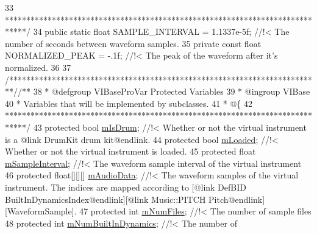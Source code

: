 \begin{DoxyCodeInclude}
33 \textcolor{comment}{    *****************************************************************************/}
34     \textcolor{keyword}{public} \textcolor{keyword}{static} \textcolor{keywordtype}{float} SAMPLE\_INTERVAL = 1.1337e-5f; \textcolor{comment}{//!< The number of seconds between waveform samples.}
35 \textcolor{comment}{}    \textcolor{keyword}{private} \textcolor{keyword}{const} \textcolor{keywordtype}{float} NORMALIZED\_PEAK = -.1f; \textcolor{comment}{//!< The peak of the waveform after it's normalized.}
36 \textcolor{comment}{}
37     \textcolor{comment}{/*************************************************************************/}\textcolor{comment}{/** }
38 \textcolor{comment}{     * @defgroup VIBaseProVar Protected Variables}
39 \textcolor{comment}{     * @ingroup VIBase}
40 \textcolor{comment}{     * Variables that will be implemented by subclasses.}
41 \textcolor{comment}{     * @\{}
42 \textcolor{comment}{    *****************************************************************************/}
43     \textcolor{keyword}{protected} \textcolor{keywordtype}{bool}                               \hyperlink{group___v_i_base_pro_var_ga47dbd8aa02ab32b8f802adfd2d3d81de}{mIsDrum}; \textcolor{comment}{//!< Whether or not the virtual instrument
       is a @link DrumKit drum kit@endlink. }
44 \textcolor{comment}{}    \textcolor{keyword}{protected} \textcolor{keywordtype}{bool}                               \hyperlink{group___v_i_base_pro_var_ga8978807d1878db5aae91fbd057c46097}{mLoaded}; \textcolor{comment}{//!< Whether or not the virtual instrument
       is loaded.}
45 \textcolor{comment}{}    \textcolor{keyword}{protected} \textcolor{keywordtype}{float}                              \hyperlink{group___v_i_base_pro_var_ga20c1d3d25ea666378d72c833d160ae2e}{mSampleInterval}; \textcolor{comment}{//!< The waveform sample
       interval of the virtual instrument}
46 \textcolor{comment}{}    \textcolor{keyword}{protected} \textcolor{keywordtype}{float}[][][]                        \hyperlink{group___v_i_base_pro_var_ga52e76d9b74408660584676035a92a2c6}{mAudioData}; \textcolor{comment}{//!< The waveform samples of the
       virtual instrument. The indices are mapped according to [@link DefBID BuiltInDynamicsIndex@endlink][@link
       Music::PITCH Pitch@endlink][WaveformSample].}
47 \textcolor{comment}{}    \textcolor{keyword}{protected} \textcolor{keywordtype}{int}                                \hyperlink{group___v_i_base_pro_var_ga9a602db8c9833ce75d95dd453c27d341}{mNumFiles}; \textcolor{comment}{//!< The number of sample files}
48 \textcolor{comment}{}    \textcolor{keyword}{protected} \textcolor{keywordtype}{int}                                \hyperlink{group___v_i_base_pro_var_gac265f64f759d267ee1e1680f8d387011}{mNumBuiltInDynamics}; \textcolor{comment}{//!< The number of
}
\end{DoxyCodeInclude}
